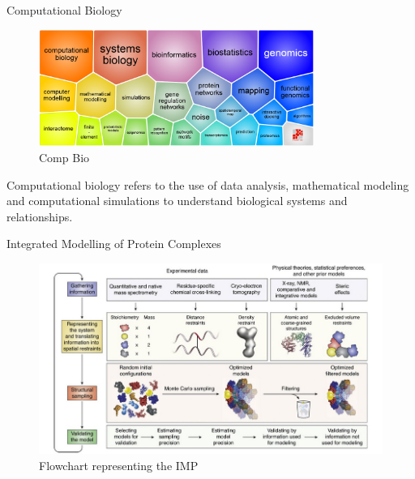 \begin{frame}{Computational Biology}

    \begin{figure}
        \centering
        \includegraphics[width=0.8\textwidth]{images/bioinf.png}
        \caption{Comp Bio}
    \end{figure}

    Computational biology refers to the use of data analysis, mathematical modeling and computational simulations to understand biological systems and relationships.


\end{frame}

\begin{frame}{Integrated Modelling of Protein Complexes}
    \begin{figure}
        \centering
        \includegraphics[width=1\textwidth]{images/imp.png}
        \caption{Flowchart representing the IMP}
        \label{fig:my_label}
    \end{figure}
\end{frame}

